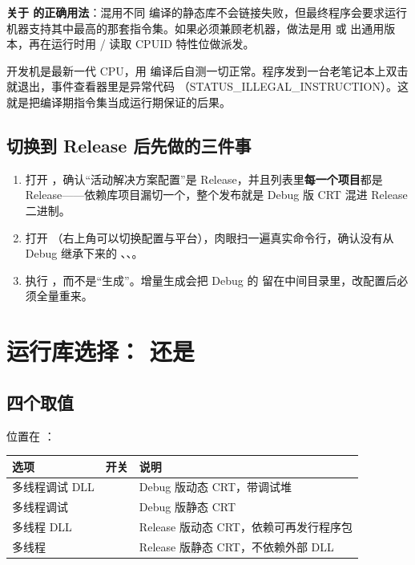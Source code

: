 \textbf{关于  的正确用法}：混用不同  编译的静态库不会链接失败，但最终程序会要求运行机器支持其中最高的那套指令集。如果必须兼顾老机器，做法是用  或  出通用版本，再在运行时用  /  读取 CPUID 特性位做派发。

\begin{keybox}[实战场景]
开发机是最新一代 CPU，用  编译后自测一切正常。程序发到一台老笔记本上双击就退出，事件查看器里是异常代码 （STATUS\_ILLEGAL\_INSTRUCTION）。这就是把编译期指令集当成运行期保证的后果。
\end{keybox}
\subsection{切换到 Release 后先做的三件事}
\begin{enumerate}
  \item 打开 ，确认“活动解决方案配置”是 Release，并且列表里\textbf{每一个项目}都是 Release——依赖库项目漏切一个，整个发布就是 Debug 版 CRT 混进 Release 二进制。
  \item 打开 （右上角可以切换配置与平台），肉眼扫一遍真实命令行，确认没有从 Debug 继承下来的 、、。
  \item 执行 ，而不是“生成”。增量生成会把 Debug 的  留在中间目录里，改配置后必须全量重来。
\end{enumerate}
\section{运行库选择： 还是 }
\subsection{四个取值}
位置在 ：

\begin{longtable}{L{3.6cm}L{2.4cm}L{8.6cm}}
\toprule
\textbf{选项} & \textbf{开关} & \textbf{说明} \\
\midrule
多线程调试 DLL &  & Debug 版动态 CRT，带调试堆 \\
多线程调试 &  & Debug 版静态 CRT \\
多线程 DLL &  & Release 版动态 CRT，依赖可再发行程序包 \\
多线程 &  & Release 版静态 CRT，不依赖外部 DLL \\
\bottomrule
\end{longtable}

